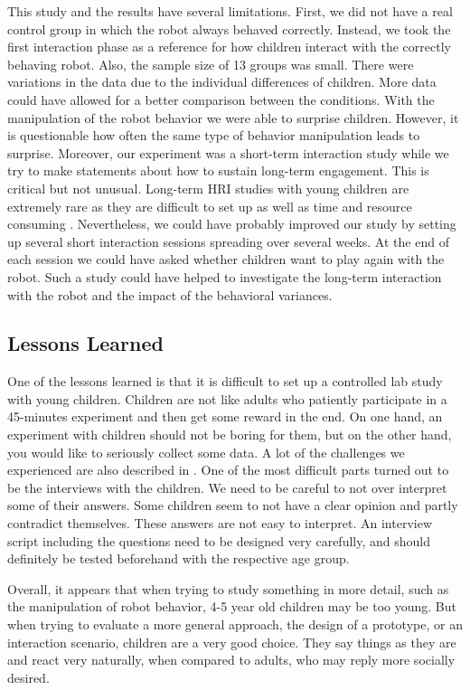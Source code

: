\documentclass{sig-alternate}
\begin{document}
This study and the results have several limitations.  First, we did not have a
real control group in which the robot always behaved correctly. Instead, we took
the first interaction phase as a reference for how children interact with the
correctly behaving robot.  Also, the sample size of 13 groups was small. There
were  variations in the data due to the individual differences of children. More
data could have allowed for a better comparison between the conditions.  With
the manipulation of the robot behavior we were able to surprise children.
However, it is questionable how often the same type of behavior manipulation
leads to surprise. Moreover, our experiment was a short-term interaction study
while we try to make statements about how to sustain long-term engagement. This
is critical but not unusual. Long-term HRI studies with young children are
extremely rare as they are difficult to set up as well as time and resource
consuming \cite{leite_long-term_2013}. Nevertheless, we could have probably
improved our study by setting up several short interaction sessions spreading
over several weeks. At the end of each session we could have asked whether
children want to play again with the robot. Such a study could have helped to
investigate the long-term interaction with the robot and the impact of the
behavioral variances.

\subsection{Lessons Learned}

One of the lessons learned is that it is difficult to set up a controlled lab
study with young children. Children are not like adults who patiently
participate in a 45-minutes experiment and then get some reward in the end. On
one hand, an experiment with children should not be boring for them, but on the
other hand, you would like to seriously collect some data. A lot of the
challenges we experienced are also described in \cite{ros_child-robot_2011}. One
of the most difficult parts turned out to be the interviews with the children.
We need to be careful to not over interpret some of their answers. Some children
seem to not have a clear opinion and partly contradict themselves. These answers
are not easy to interpret. An interview script including the questions need to
be designed very carefully, and should definitely be tested beforehand with the
respective age group.

Overall, it appears that when trying to study something in more detail, such as
the manipulation of robot behavior, 4-5 year old children may be too young. But
when trying to evaluate a more general approach, the design of a prototype, or
an interaction scenario, children are a very good choice. They say things as
they are and react very naturally, when compared to adults, who may reply more
socially desired. 
\end{document}
